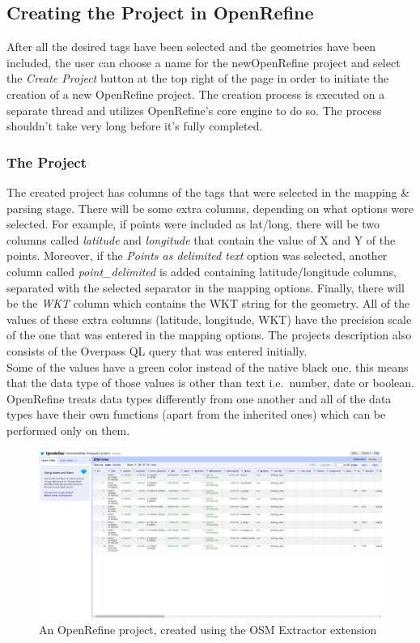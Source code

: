 \subsection{Creating the Project in OpenRefine}
After all the desired tags have been selected and the geometries have been included, the user can choose a
name for the newOpenRefine project and select the \textit{Create Project} button at the top right of the
page in order to initiate the creation of a new OpenRefine project.
The creation process is executed on a separate thread and utilizes OpenRefine's core engine to do so.
The process shouldn't take very long before it's fully completed.
\subsubsection{The Project}
The created project has columns of the tags that were selected in the mapping \& parsing stage. There will be some extra columns,
depending on what options were selected. For example, if points were included as lat/long, there will be two columns called \textit{latitude}
and \textit{longitude} that contain the value of X and Y of the points. Moreover, if the \textit{Points as delimited text} option was selected,
another column called \textit{point\_delimited} is added containing latitude/longitude columns, separated with
the selected separator in the mapping options. Finally, there will be the \textit{WKT} column which contains
the WKT string for the geometry. All of the values of these extra columns (latitude, longitude, WKT) have the precision scale of the one that was entered in
the mapping options. The project\textquotesingle s description also consists of the Overpass QL query that was entered initially.\\
\newline
Some of the values have a green color instead of the native black one, this means that the data type of those values is other
than text i.e.\ number, date or boolean.
OpenRefine treats data types differently from one another and all of the data types
have their own functions (apart from the inherited ones) which can be performed
only on them.\\
\begin{figure}[H]
    \includegraphics[width=\linewidth]{./Figures/OSM_Extractor/osm_extractor_project.png}
    \caption{An OpenRefine project, created using the OSM Extractor extension}
\end{figure}
